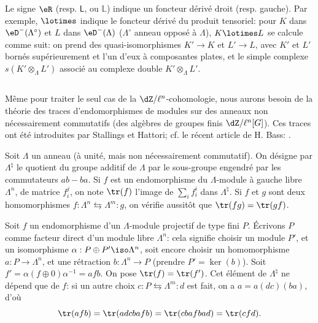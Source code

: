 Le signe $\eR$ (resp. $\mathsf{L}$, ou $\mathbb{L}$) indique un foncteur dérivé droit (resp. 
gauche). Par exemple, $\lotimes$ indique le foncteur dérivé du produit 
tensoriel: pour $K$ dans $\eD^-(\Lambda^\circ)$ et $L$ dans $\eD^-(\Lambda)$ 
($\Lambda^\circ$ anneau opposé à $\Lambda$), $K\lotimes L$ se calcule 
comme suit: on prend des quasi-isomorphismes $K'\to K$ et $L'\to L$, avec 
$K'$ et $L'$ bornés supérieurement et l'un d'eux à composantes plates, et 
le simple complexe $s(K'\otimes_\Lambda L')$ associé au complexe double 
$K'\otimes_\Lambda L'$. 





\subsection{}\label{II:4-2}

Même pour traiter le seul cas de la $\dZ/\ell^n$-cohomologie, nous aurons 
besoin de la théorie des traces d'endomorphismes de modules sur des anneaux 
non nécessairement commutatifs (des algèbres de groupes finis 
$\dZ/\ell^n[G]$). Ces traces ont été introduites par Stallings et Hattori; cf. le récent article de H. Bass: 
. 

Soit $\Lambda$ un anneau (à unité, mais non nécessairement commutatif). 
On désigne par $\Lambda^\natural$ le quotient du groupe additif de $\Lambda$ par le 
sous-groupe engendré par les commutateurs $a b - b a$. Si $f$ est un 
endomorphisme du $\Lambda$-module à gauche libre $\Lambda^n$, de matrice 
$f_i^j$, on note $\tr(f)$ l'image de $\sum_i f_i^i$ dans $\Lambda^\natural$. 
Si $f$ et $g$ sont deux homomorphismes 
$f:\Lambda^n \leftrightarrows \Lambda^m : g$, on vérifie aussitôt que 
$\tr(f g) = \tr(g f)$. 

Soit $f$ un endomorphisme d'un $\Lambda$-module projectif de type fini $P$. 
Écrivons $P$ comme facteur direct d'un module libre $\Lambda^n$: cela signifie 
choisir un module $P'$, et un isomorphisme $\alpha:P\oplus P'\iso \Lambda^n$, 
soit encore choisir un homomorphisme $a:P\to \Lambda^n$, et une rétraction 
$b:\Lambda^n\to P$ (prendre $P'=\ker(b)$). Soit 
$f'=\alpha(f\oplus 0)\alpha^{-1} =af b$. On pose $\tr(f) = \tr(f')$. Cet 
élément de $\Lambda^\natural$ ne dépend que de $f$: si un autre choix 
$c:P\leftrightarrows \Lambda^m:d$ est fait, on a $a=a(dc)(ba)$, d'où 
\[
 \tr(a f b) = \tr(adcbafb) = \tr(cbafbad) = \tr(cfd) \text{.}
\]

